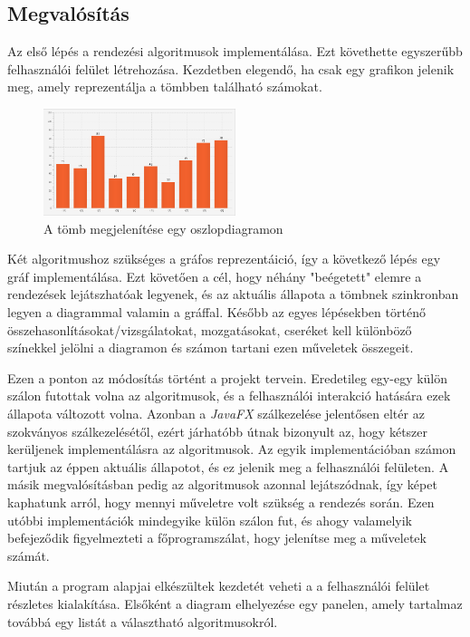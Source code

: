 \documentclass{elteikthesis}
\begin{document}
\subsection{Megvalósítás}
Az első lépés a rendezési algoritmusok implementálása.
Ezt követhette egyszerűbb felhasználói felület létrehozása. Kezdetben elegendő, ha csak egy grafikon jelenik meg, amely reprezentálja a tömbben található számokat.\par
\begin{figure}
	\centering
	\includegraphics[width=0.5\textwidth]{pics/diagram.png}
	\caption{A tömb megjelenítése egy oszlopdiagramon}
\end{figure}
Két algoritmushoz szükséges a gráfos reprezentáició, így a következő lépés egy gráf implementálása.
Ezt követően a cél, hogy néhány "beégetett" elemre a rendezések lejátszhatóak legyenek, és az aktuális állapota a tömbnek szinkronban legyen a diagrammal valamin a gráffal. Később az egyes lépésekben történő összehasonlításokat/vizsgálatokat, mozgatásokat, cseréket kell különböző színekkel jelölni a diagramon és számon tartani ezen műveletek összegeit.\par
Ezen a ponton az módosítás történt a projekt tervein. Eredetileg egy-egy külön szálon futottak volna az algoritmusok, és a felhasználói interakció hatására ezek állapota változott volna. Azonban a \emph{JavaFX} szálkezelése jelentősen eltér az szokványos szálkezelésétől, ezért járhatóbb útnak bizonyult az, hogy kétszer kerüljenek implementálásra az algoritmusok. Az egyik implementációban számon tartjuk az éppen aktuális állapotot, és ez jelenik meg a felhasználói felületen. A másik megvalósításban pedig az algoritmusok azonnal lejátszódnak, így képet kaphatunk arról, hogy mennyi műveletre volt szükség a rendezés során. Ezen utóbbi implementációk mindegyike külön szálon fut, és ahogy valamelyik befejeződik figyelmezteti a főprogramszálat, hogy jelenítse meg a műveletek számát.\par
Miután a program alapjai elkészültek kezdetét veheti a a felhasználói felület részletes kialakítása. Elsőként a diagram elhelyezése egy panelen, amely tartalmaz továbbá egy listát a választható algoritmusokról.\par
\end{document}
